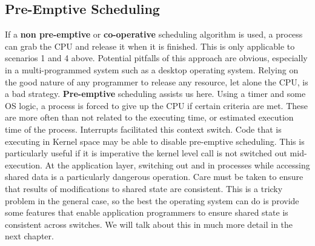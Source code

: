 \documentclass[10pt,a4paper]{article}
\begin{document}
\subsection{Pre-Emptive Scheduling}
If a {\bf non pre-emptive} or {\bf co-operative} scheduling algorithm is used, a process can grab the CPU and release it when it is finished. This is only applicable to scenarios 1 and 4 above. Potential pitfalls of this approach are obvious, especially in a multi-programmed system such as a desktop operating system. Relying on the good nature of any programmer to release any resource, let alone the CPU, is a bad strategy. {\bf Pre-emptive} scheduling assists us here. Using a timer and some OS logic, a process is forced to give up the CPU if certain criteria are met. These are more often than not related to the executing time, or estimated execution time of the process. Interrupts facilitated this context switch. Code that is executing in Kernel space may be able to disable pre-emptive scheduling. This is particularly useful if it is imperative the kernel level call is not switched out mid-execution. 
\newline\newline
At the application layer, switching out and in processes while accessing shared data is a particularly dangerous operation. Care must be taken to ensure that results of modifications to shared state are consistent. This is a tricky problem in the general case, so the best the operating system can do is provide some features that enable application programmers to ensure shared state is consistent across switches. We will talk about this in much more detail in the next chapter. 
\end{document}
